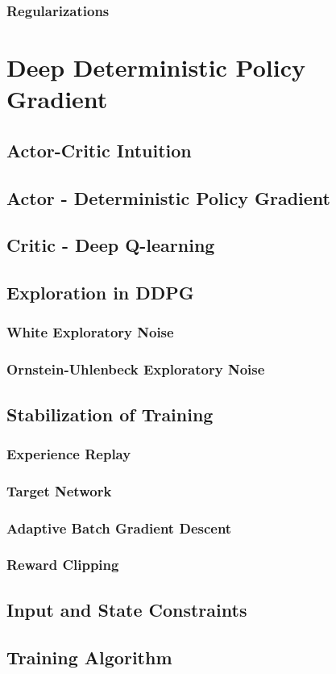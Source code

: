 \subsubsection{Regularizations}




\section{Deep Deterministic Policy Gradient}
\subsection{Actor-Critic Intuition}
\subsection{Actor - Deterministic Policy Gradient}
\subsection{Critic - Deep Q-learning}

\newpage

\subsection{Exploration in DDPG}
\subsubsection{White Exploratory Noise}
\subsubsection{Ornstein-Uhlenbeck Exploratory Noise}
\subsection{Stabilization of Training}
\subsubsection{Experience Replay}
\subsubsection{Target Network}
\subsubsection{Adaptive Batch Gradient Descent}
\subsubsection{Reward Clipping}
\subsection{Input and State Constraints}
\subsection{Training Algorithm}


